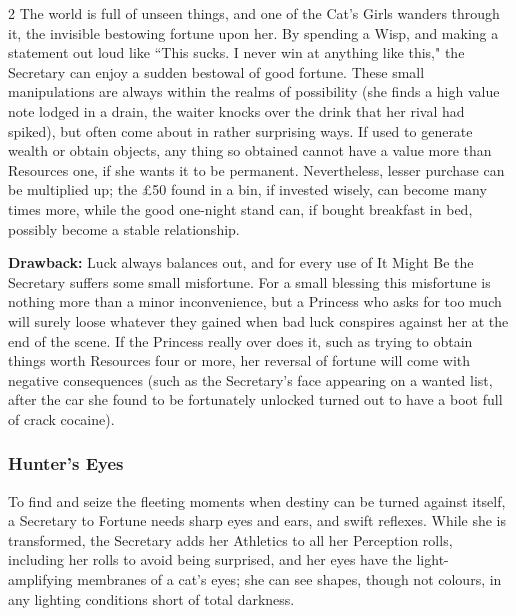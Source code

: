 \begin{multicols}{2}
The world is full of unseen things, and one of the Cat's Girls wanders through it, the invisible bestowing fortune upon her. By spending a Wisp, and making a statement out loud like \textquotedblleft This sucks. I never win at anything like this," the Secretary can enjoy a sudden bestowal of good fortune. These small manipulations are always within the realms of possibility (she finds a high value note lodged in a drain, the waiter knocks over the drink that her rival had spiked), but often come about in rather surprising ways. If used to generate wealth or obtain objects, any thing so obtained cannot have a value more than Resources one, if she wants it to be permanent. Nevertheless, lesser purchase can be multiplied up; the £50 found in a bin, if invested wisely, can become many times more, while the good one-night stand can, if bought breakfast in bed, possibly become a stable relationship. 

\textbf{Drawback:} Luck always balances out, and for every use of It Might Be the Secretary suffers some small misfortune. For a small blessing this misfortune is nothing more than a minor inconvenience, but a Princess who asks for too much will surely loose whatever they gained when bad luck conspires against her at the end of the scene. If the Princess really over does it, such as trying to obtain things worth Resources four or more, her reversal of fortune will come with negative consequences (such as the Secretary's face appearing on a wanted list, after the car she found to be fortunately unlocked turned out to have a boot full of crack cocaine). 

\subsubsection*{Hunter's Eyes}

To find and seize the fleeting moments when destiny can be turned against itself, a Secretary to Fortune needs sharp eyes and ears, and swift reflexes. While she is transformed, the Secretary adds her Athletics to all her Perception rolls, including her rolls to avoid being surprised, and her eyes have the light-amplifying membranes of a cat's eyes; she can see shapes, though not colours, in any lighting conditions short of total darkness.


\end{multicols}
